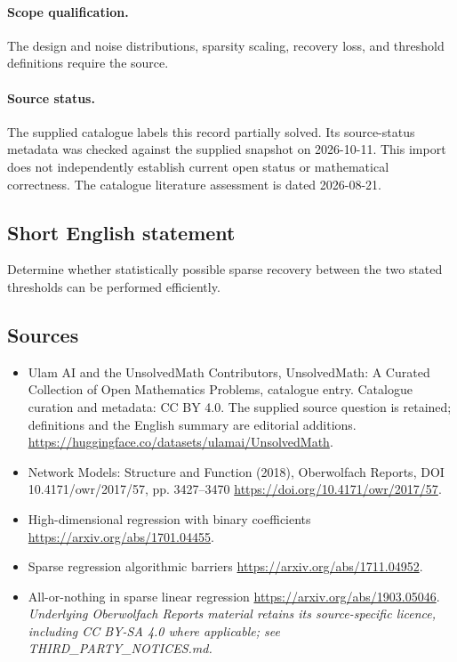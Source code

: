 \documentclass[11pt]{article}
\begin{document}
\paragraph{Scope qualification.}
The design and noise distributions, sparsity scaling, recovery loss, and threshold definitions require the source.
\paragraph{Source status.}
The supplied catalogue labels this record partially solved. Its source-status metadata was checked against the supplied snapshot on 2026-10-11. This import does not independently establish current open status or mathematical correctness. The catalogue literature assessment is dated 2026-08-21.
\subsection{Short English statement}
Determine whether statistically possible sparse recovery between the two stated thresholds can be performed efficiently.
\subsection{Sources}
\begin{itemize}
\item[S1] Ulam AI and the UnsolvedMath Contributors, UnsolvedMath: A Curated Collection of Open Mathematics Problems, catalogue entry. Catalogue curation and metadata: CC BY 4.0. The supplied source question is retained; definitions and the English summary are editorial additions.
\url{https://huggingface.co/datasets/ulamai/UnsolvedMath}.
\item[S2] Network Models: Structure and Function (2018), Oberwolfach Reports, DOI 10.4171/owr/2017/57, pp. 3427--3470
\url{https://doi.org/10.4171/owr/2017/57}.
\item[S3] High-dimensional regression with binary coefficients
\url{https://arxiv.org/abs/1701.04455}.
\item[S4] Sparse regression algorithmic barriers
\url{https://arxiv.org/abs/1711.04952}.
\item[S5] All-or-nothing in sparse linear regression
\url{https://arxiv.org/abs/1903.05046}.
\textit{Underlying Oberwolfach Reports material retains its source-specific licence, including CC BY-SA 4.0 where applicable; see THIRD\_PARTY\_NOTICES.md.}
\end{itemize}
\end{document}
